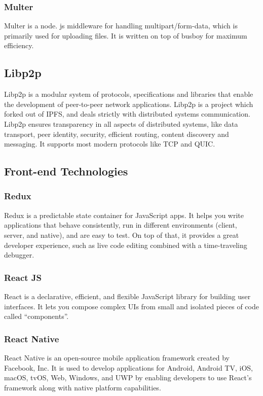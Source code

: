     \subsubsection{Multer}
    Multer is a node. js middleware for handling multipart/form-data, 
    which is primarily used for uploading files. It is written on top of busboy for maximum efficiency.

    \subsection{Libp2p}
    Libp2p is a modular system of protocols, specifications and libraries that enable the development of peer-to-peer network applications. 
    Libp2p is a project which forked out of IPFS, and deals strictly with distributed systems communication. Libp2p ensures transparency in 
    all aspects of distributed systems, like data transport, peer identity, security, efficient routing, content discovery and messaging. It 
    supports most modern protocols like TCP and QUIC.

\subsection{Front-end Technologies}

    \subsubsection{Redux}
    Redux is a predictable state container for JavaScript apps.
    It helps you write applications that behave consistently, run in different environments 
    (client, server, and native), and are easy to test. On top of that, it provides a great developer experience, 
    such as live code editing combined with a time-traveling debugger.
    
    \subsubsection{React JS}
    React is a declarative, efficient, and flexible JavaScript library for building user interfaces. 
    It lets you compose complex UIs from small and isolated pieces of code called “components”.

    \subsubsection{React Native}
    React Native is an open-source mobile application framework created by Facebook, Inc.
    It is used to develop applications for Android, Android TV, iOS, macOS, tvOS, Web, Windows, and UWP by enabling developers to use React's framework along with native platform capabilities.


